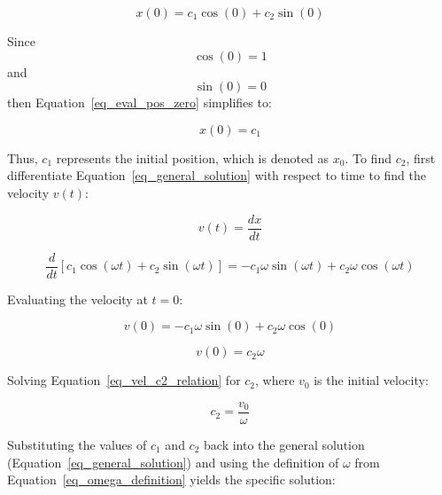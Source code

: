 \documentclass{article}
\begin{document}
\begin{equation}
x(0) = c_1 \cos(0) + c_2 \sin(0)
\label{eq_eval_pos_zero}
\end{equation}

Since 
\begin{equation}
\cos(0) = 1    
\label{cos_zero}
\end{equation}
and 
\begin{equation}
    \sin(0) = 0
    \label{sin_zero}
\end{equation}
then Equation~\ref{eq_eval_pos_zero} simplifies to:

\begin{equation}
x(0) = c_1
\label{eq_c1_is_x0}
\end{equation}

Thus, $c_1$ represents the initial position, which is denoted as $x_0$. To find $c_2$,  first differentiate Equation~\ref{eq_general_solution} with respect to time to find the velocity $v(t)$:

\begin{equation}
v(t) = \frac{dx}{dt}
\label{eq_velocity_def}
\end{equation}

\begin{equation}
\frac{d}{dt} [c_1 \cos(\omega t) + c_2 \sin(\omega t)] = -c_1 \omega \sin(\omega t) + c_2 \omega \cos(\omega t)
\label{eq_velocity_derivation}
\end{equation}

Evaluating the velocity at $t=0$:

\begin{equation}
v(0) = -c_1 \omega \sin(0) + c_2 \omega \cos(0)
\label{eq_eval_vel_zero}
\end{equation}

\begin{equation}
v(0) = c_2 \omega
\label{eq_vel_c2_relation}
\end{equation}

Solving Equation~\ref{eq_vel_c2_relation} for $c_2$, where $v_0$ is the initial velocity:

\begin{equation}
c_2 = \frac{v_0}{\omega}
\label{eq_c2_is_v0_omega}
\end{equation}

Substituting the values of $c_1$ and $c_2$ back into the general solution (Equation~\ref{eq_general_solution}) and using the definition of $\omega$ from Equation~\ref{eq_omega_definition} yields the specific solution:
\end{document}
